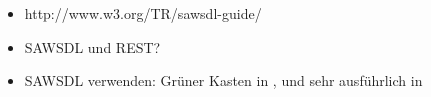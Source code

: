 


\begin{itemize}
\item http://www.w3.org/TR/sawsdl-guide/
\item \ac{SAWSDL} und \ac{REST}? \cite{xn-sss}
\item \ac{SAWSDL} verwenden: Grüner Kasten in \cite[S.63]{ky-sawsdl}, \cite{flexbrok} und sehr ausführlich in \cite{vr-sesa}
\end{itemize}